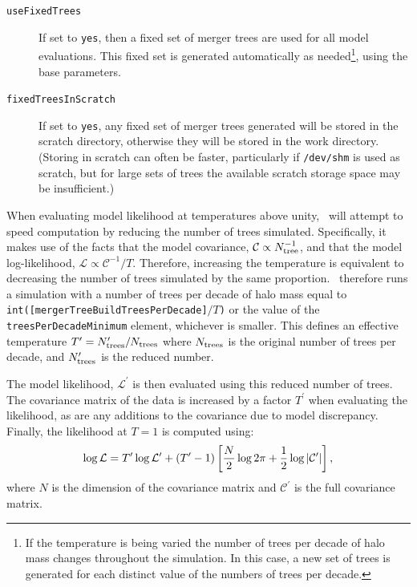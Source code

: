 \begin{description}
\item[{\tt useFixedTrees}] If set to {\tt yes}, then a fixed set of merger trees are used for all model evaluations. This fixed set is generated automatically as needed\footnote{If the temperature is being varied the number of trees per decade of halo mass changes throughout the simulation. In this case, a new set of trees is generated for each distinct value of the numbers of trees per decade.}, using the base parameters.
\item[{\tt fixedTreesInScratch}] If set to {\tt yes}, any fixed set of merger trees generated will be stored in the scratch directory, otherwise they will be stored in the work directory. (Storing in scratch can often be faster, particularly if {\tt /dev/shm} is used as scratch, but for large sets of trees the available scratch storage space may be insufficient.)
\end{description}

When evaluating model likelihood at temperatures above unity, \glc\ will attempt to speed computation by reducing the number of trees simulated. Specifically, it makes use of the facts that the model covariance, $\mathcal{C} \propto N_{\rm tree}^{-1}$, and that the model log-likelihood, $\mathcal{L} \propto \mathcal{C}^{-1}/T$. Therefore, increasing the temperature is equivalent to decreasing the number of trees simulated by the same proportion. \glc\ therefore runs a simulation with a number of trees per decade of halo mass equal to {\tt int([mergerTreeBuildTreesPerDecade]}$/T${\tt )} or the value of the {\tt treesPerDecadeMinimum} element, whichever is smaller. This defines an effective temperature $T^\prime=N_{\rm trees}^\prime/N_{\rm trees}$ where $N_{\rm trees}$ is the original number of trees per decade, and $N_{\rm trees}^\prime$ is the reduced number.

The model likelihood, $\mathcal{L}^\prime$ is then evaluated using this reduced number of trees. The covariance matrix of the data is increased by a factor $T^\prime$ when evaluating the likelihood, as are any additions to the covariance due to model discrepancy. Finally, the likelihood at $T=1$ is computed using:
\begin{equation}
\log \mathcal{L} = T^\prime \log \mathcal{L}^\prime + (T^\prime-1)\left[ {N \over 2} \log 2 \pi + {1 \over 2} \log |\mathcal{C}^\prime| \right],
\end{equation}
where $N$ is the dimension of the covariance matrix and $\mathcal{C}^\prime$ is the full covariance matrix.

